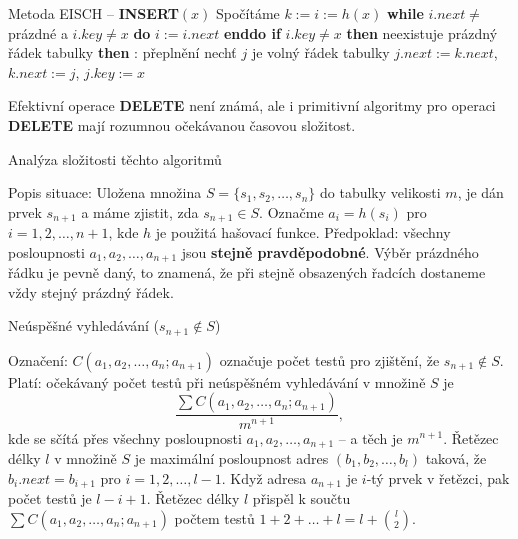 \documentclass[a4paper,12pt]{article}
\begin{document}
Metoda EISCH -- {\bf INSERT$(x)$}\newline 
Spočítáme $k:=i:=h(x)$\newline 
{\bf while} $i.next\ne$prázdné a $i.key\ne x$ {\bf do} $i:=i.
next$ {\bf enddo \newline 
if} $i.key\ne x$ {\bf then}\newline 
\phantom{---}{\bf if} neexistuje prázdný řádek tabulky {\bf then}\newline 
\phantom{------}{\bf Výstup}: přeplnění\newline 
\phantom{---}{\bf else}\newline 
\phantom{------}nech\v t $j$ je volný řádek tabulky\newline 
\phantom{------}$j.next:=k.next$, $k.next:=j$, $j.key:=x$\newline 
\phantom{---}{\bf endif\newline 
endif}
\bigskip

Efektivní operace {\bf DELETE}  není známá, ale i primitivní 
algoritmy pro operaci {\bf DELETE} mají rozumnou očekávanou 
časovou složitost.

\subhead
Analýza složitosti těchto algoritmů
\endsubhead

Popis situace: Uložena množina 
$S=\{s_1,s_2,\dots,s_n\}$ do ta\-bulky velikosti $m$, je dán 
prvek $s_{n+1}$ a máme zjistit, zda $s_{n+1}\in S$. Označme 
$a_i=h(s_i)$ pro $i=1,2,\dots,n+1$, kde $h$ je použitá hašovací 
funkce.\newline 
Předpoklad: všechny posloupnosti $a_1,a_2,\dots,a_{n+1}$ jsou 
{\bf stejně pravděpodobné}. Výběr prázdného řádku je 
pevně daný, to znamená, že při stejně obsazených 
řadcích dostaneme vždy stejný prázdný řádek.  

\subhead
Neúspěšné vyhledávání ($s_{n+1}\notin S$) 
\endsubhead

Označení: $C(a_1,a_2,\dots,a_n;a_{n+1})$ označuje počet 
testů pro zjiš\-tění, že $s_{n+1}\notin S$. Platí: 
očekávaný počet testů při 
neúspěšném vy\-hledávání v množině $S$ je 
$$\frac {\sum C(a_1,a_2,\dots,a_n;a_{n+1})}{m^{n+1}},$$
kde se sčítá přes všechny posloupnosti $a_1,a_2,\dots
,a_{n+1}$ -- 
a těch je $m^{n+1}$. \newline 
Řetězec délky $l$ v množině $S$ je maximální posloupnost 
adres $(b_1,b_2,\dots,b_l)$ taková, že $b_i.next=b_{i+1}$ pro 
$i=1,2,\dots,l-1$.
Když adresa $a_{n+1}$ je $i$-tý prvek v řetězci, pak počet 
testů je $l-i+1$. Řetězec délky $l$ přispěl k součtu 
$\sum C(a_1,a_2,\dots,a_n;a_{n+1})$ počtem testů $1+2+\dots+l=l+\binom l2$. 
\end{document}
